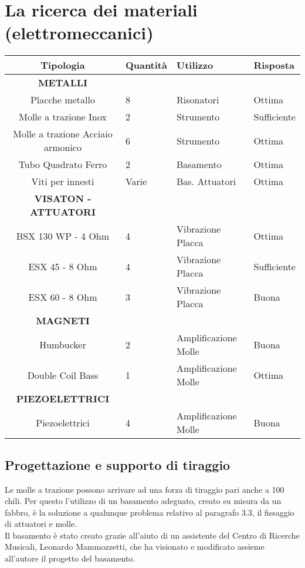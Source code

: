
\chapter{La ricerca dei materiali (elettromeccanici)}
\label{chp:La ricerca dei materiali (elettromeccanici)}

\begin{tabular}{cp{1cm}p{1cm}p{1cm}} \textbf{Tipologia}&\textbf{Quantità}&\textbf{Utilizzo}&\textbf{Risposta}\\ 
\hline \textbf{METALLI}\\
\hline Placche metallo&8&Risonatori&Ottima\\
\hline Molle a trazione Inox&2&Strumento&Sufficiente\\
\hline Molle a trazione Acciaio armonico&6&Strumento&Ottima\\
\hline Tubo Quadrato Ferro&2&Basamento&Ottima\\
\hline Viti per innesti&Varie&Bas. Attuatori&Ottima\\
\hline \textbf{VISATON - ATTUATORI}\\
\hline BSX 130 WP - 4 Ohm&4&Vibrazione Placca&Ottima\\ 
\hline ESX 45 - 8 Ohm&4&Vibrazione Placca&Sufficiente\\
\hline ESX 60 - 8 Ohm&3&Vibrazione Placca&Buona\\
\hline \textbf{MAGNETI}\\
\hline Humbucker&2&Amplificazione Molle&Buona\\
\hline Double Coil Bass&1&Amplificazione Molle&Ottima\\
\hline \textbf{PIEZOELETTRICI}\\
\hline Piezoelettrici&4&Amplificazione Molle&Buona\\
\hline 
\end{tabular}

\section{Progettazione e supporto di tiraggio}

Le molle a trazione possono arrivare ad una forza di tiraggio pari anche a 100 chili. Per questo l'utilizzo di un basamento adeguato, creato su misura da un fabbro, è la soluzione a qualunque problema relativo al paragrafo 3.3, il fissaggio di attuatori e molle.\\
Il basamento è stato creato grazie all'aiuto di un assistente del Centro di Ricerche Musicali, Leonardo Mammozzetti, che ha visionato e modificato assieme all'autore il progetto del basamento.

